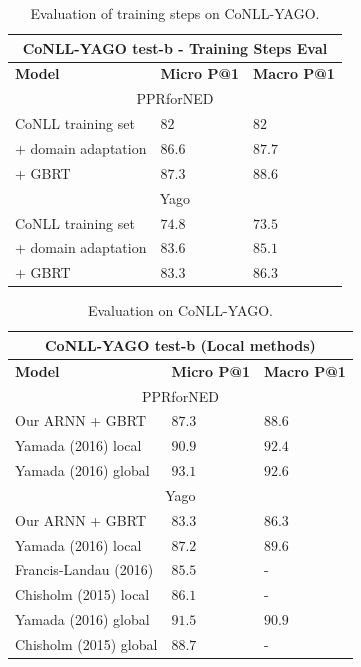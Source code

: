 \documentclass[11pt,letterpaper]{article}
\begin{document}
	\begin{table}[ht]
		\begin{center}
			\begin{tabular}{|p{3.5cm}| p{1.3cm} p{1.3cm}|}
				\hline \multicolumn{3}{|c|}{CoNLL-YAGO test-b - Training Steps Eval} \\
				\hline \textbf{Model} & \textbf{Micro P@1} & \textbf{Macro P@1} \\ 
				\hline \multicolumn{3}{|c|}{PPRforNED} \\
				\hline CoNLL training set    & $82$  & $82$ \\
				+ domain adaptation    & $86.6$  & $87.7$ \\
				+ GBRT    & $87.3$  & $88.6$ \\
				\hline \multicolumn{3}{|c|}{Yago} \\
				\hline CoNLL training set    & $74.8$  & $73.5$ \\
				+ domain adaptation    & $83.6$  & $85.1$ \\
				+ GBRT    & $83.3$  & $86.3$ \\
				\hline
			\end{tabular}
		\end{center}
		\caption{\label{tab:training} Evaluation of training steps on CoNLL-YAGO.}
	\end{table}
	
	\begin{table}[ht]
		\begin{center}
			\begin{tabular}{|p{3.7cm}| p{1.2cm} p{1.2cm}|}
				\hline \multicolumn{3}{|c|}{CoNLL-YAGO test-b (Local methods)} \\
				\hline \textbf{Model} & \textbf{Micro P@1} & \textbf{Macro P@1} \\ 
				\hline \multicolumn{3}{|c|}{PPRforNED} \\
				\hline Our ARNN + GBRT    & $87.3$  & $88.6$ \\
				Yamada (2016) local               & $90.9$  & $92.4$ \\
				\hline Yamada (2016) global               & $93.1$  & $92.6$ \\
				\hline \multicolumn{3}{|c|}{Yago} \\
				\hline Our ARNN + GBRT    & $83.3$  & $86.3$ \\
				Yamada (2016) local               & $87.2$  & $89.6$ \\
				Francis-Landau (2016)             & $85.5$  & - \\
				Chisholm (2015) local             & $86.1$  & - \\
				\hline Yamada (2016) global               & $91.5$  & $90.9$ \\
				Chisholm (2015) global             & $88.7$  & - \\
				\hline
			\end{tabular}
		\end{center}
		\caption{\label{tab:conll} Evaluation on CoNLL-YAGO.}
	\end{table}
	
\end{document}
